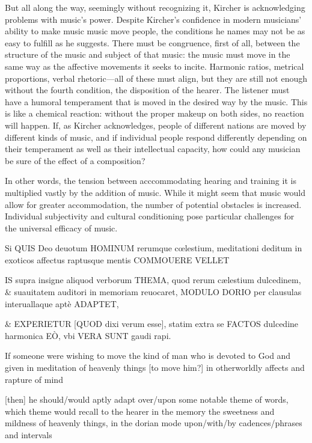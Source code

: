 But all along the way, seemingly without recognizing it, Kircher is acknowledging problems with music's power.
Despite Kircher's confidence in modern musicians' ability to make music music move people, the conditions he names may not be as easy to fulfill as he suggests.
There must be congruence, first of all, between the structure of the music and subject of that music: the music must move in the same way as the affective movements it seeks to incite.
Harmonic ratios, metrical proportions, verbal rhetoric---all of these must align, but they are still not enough without the fourth condition, the disposition of the hearer.
The listener must have a humoral temperament that is moved in the desired way by the music. 
This is like a chemical reaction: without the proper makeup on both sides, no reaction will happen.
If, as Kircher acknowledges, people of different nations are moved by different kinds of music, and if individual people respond differently depending on their temperament as well as their intellectual capacity, how could any musician be sure of the effect of a composition?

In other words, the tension between acccommodating hearing and training it is multiplied vastly by the addition of music.
While it might seem that music would allow for greater accommodation, the number of potential obstacles is increased.
Individual subjectivity and cultural conditioning pose particular challenges for the universal efficacy of music.


Si 
QUIS 
Deo deuotum HOMINUM 
rerumque cœlestium, meditationi deditum in exoticos affectus raptusque mentis 
COMMOUERE VELLET 

IS 
supra insigne aliquod verborum 
THEMA, 
  quod 
  rerum cælestium dulcedinem, \& suauitatem 
  auditori in memoriam 
  reuocaret, 
MODULO DORIO per clausulas interuallaque aptè 
ADAPTET,
      
\& 
EXPERIETUR 
[QUOD dixi verum esse], 
statim extra se 
FACTOS dulcedine harmonica 
EÒ, 
vbi 
 VERA SUNT 
 gaudi rapi.





If someone
were wishing
to move
the kind of man who is devoted to God
and given in meditation of heavenly things
[to move him?]
in otherworldly affects
and rapture of mind

[then] he
should/would aptly adapt 
over/upon some notable theme of words,
which theme would recall to the hearer in the memory
the sweetness and mildness of heavenly things,
in the dorian mode upon/with/by cadences/phrases and intervals

